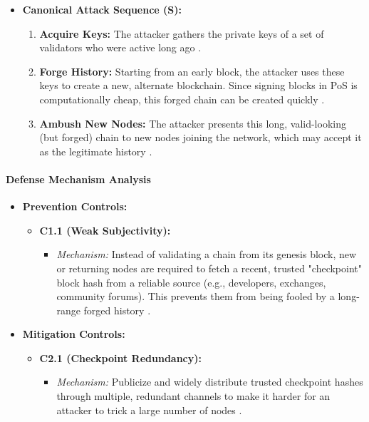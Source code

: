 \begin{itemize}
    \item \textbf{Canonical Attack Sequence (S):}
    \begin{enumerate}
        \item \textbf{Acquire Keys:} The attacker gathers the private keys of a set of validators who were active long ago \cite{Wang2019}.
        \item \textbf{Forge History:} Starting from an early block, the attacker uses these keys to create a new, alternate blockchain. Since signing blocks in PoS is computationally cheap, this forged chain can be created quickly \cite{Wang2019}.
        \item \textbf{Ambush New Nodes:} The attacker presents this long, valid-looking (but forged) chain to new nodes joining the network, which may accept it as the legitimate history \cite{Wang2019}.
    \end{enumerate}
\end{itemize}

\paragraph{Defense Mechanism Analysis}

\begin{itemize}
    \item \textbf{Prevention Controls:}
    \begin{itemize}
        \item \textbf{C1.1 (Weak Subjectivity):}
            \begin{itemize}
                \item \textit{Mechanism:} Instead of validating a chain from its genesis block, new or returning nodes are required to fetch a recent, trusted "checkpoint" block hash from a reliable source (e.g., developers, exchanges, community forums). This prevents them from being fooled by a long-range forged history \cite{Wang2019}.
            \end{itemize}
    \end{itemize}
    \item \textbf{Mitigation Controls:}
    \begin{itemize}
        \item \textbf{C2.1 (Checkpoint Redundancy):}
            \begin{itemize}
                \item \textit{Mechanism:} Publicize and widely distribute trusted checkpoint hashes through multiple, redundant channels to make it harder for an attacker to trick a large number of nodes \cite{Wang2019}.
            \end{itemize}
    \end{itemize}
\end{itemize}

